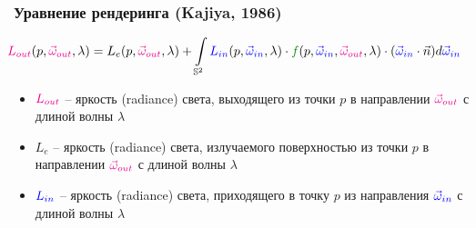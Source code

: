\documentclass[10pt]{beamer}
\begin{document}
\begin{frame}[fragile]
\frametitle{Уравнение рендеринга (Kajiya, 1986)}
\begin{equation*}
\hspace*{-0.5cm}
{\color{magenta}L_{out}}(p, {\color{magenta}\vec\omega_{out}}, \lambda) = L_{e}(p, {\color{magenta}\vec\omega_{out}}, \lambda)+\int\limits_{\mathbb S^2} {\color{blue}L_{in}}(p, {\color{blue}\vec\omega_{in}}, \lambda) \cdot {\color{green}f}(p, {\color{blue}\vec\omega_{in}}, {\color{magenta}\vec\omega_{out}}, \lambda) \cdot ({\color{blue}\vec\omega_{in}} \cdot \vec{n}) d{\color{blue}\vec\omega_{in}}
\end{equation*}
\hspace*{-0.5cm}
\pause
\begin{itemize}
\item \begin{math}{\color{magenta}L_{out}}\end{math} -- яркость (radiance) света, выходящего из точки \begin{math}p\end{math} в направлении \begin{math}{\color{magenta}\vec\omega_{out}}\end{math} с длиной волны \begin{math}\lambda\end{math}
\pause
\item \begin{math}L_{e}\end{math} -- яркость (radiance) света, излучаемого поверхностью из точки \begin{math}p\end{math} в направлении \begin{math}{\color{magenta}\vec\omega_{out}}\end{math} с длиной волны \begin{math}\lambda\end{math}
\pause
\item \begin{math}{\color{blue}L_{in}}\end{math} -- яркость (radiance) света, приходящего в точку \begin{math}p\end{math} из направления \begin{math}{\color{blue}\vec\omega_{in}}\end{math} с длиной волны \begin{math}\lambda\end{math}

\end{itemize}
\end{frame}
\end{document}
